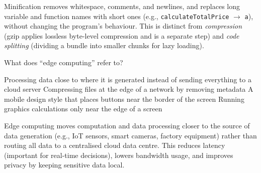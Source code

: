 \documentclass[answers]{exam}
\begin{document}
\begin{questions}
\begin{solution}
    Minification removes whitespace, comments, and newlines, and replaces long variable and function names with short ones (e.g., \texttt{calculateTotalPrice} $\to$ \texttt{a}), without changing the program's behaviour.
    This is distinct from \textit{compression} (gzip applies lossless byte-level compression and is a separate step) and \textit{code splitting} (dividing a bundle into smaller chunks for lazy loading).
\end{solution}

\question What does ``edge computing'' refer to?

\begin{choices}
    \correctchoice Processing data close to where it is generated instead of sending everything to a cloud server
    \choice Compressing files at the edge of a network by removing metadata
    \choice A mobile design style that places buttons near the border of the screen
    \choice Running graphics calculations only near the edge of a screen
\end{choices}

\begin{solution}
    Edge computing moves computation and data processing closer to the source of data generation (e.g., IoT sensors, smart cameras, factory equipment) rather than routing all data to a centralised cloud data centre.
    This reduces latency (important for real-time decisions), lowers bandwidth usage, and improves privacy by keeping sensitive data local.
\end{solution}

\end{questions}
\end{document}
